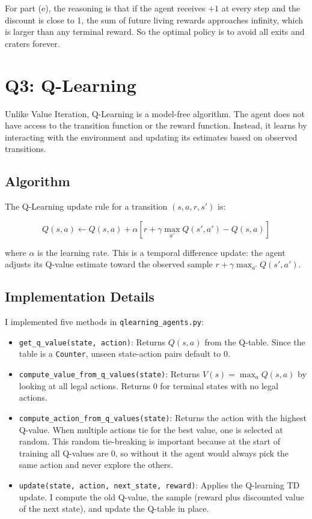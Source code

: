 \documentclass[11pt,a4paper]{article}
\begin{document}
For part (e), the reasoning is that if the agent receives $+1$ at every step and the discount is close to 1, the sum of future living rewards approaches infinity, which is larger than any terminal reward. So the optimal policy is to avoid all exits and craters forever.

\section{Q3: Q-Learning}

Unlike Value Iteration, Q-Learning is a model-free algorithm. The agent does not have access to the transition function or the reward function. Instead, it learns by interacting with the environment and updating its estimates based on observed transitions.

\subsection{Algorithm}

The Q-Learning update rule for a transition $(s, a, r, s')$ is:

\[
Q(s, a) \leftarrow Q(s, a) + \alpha \left[ r + \gamma \max_{a'} Q(s', a') - Q(s, a) \right]
\]

where $\alpha$ is the learning rate. This is a temporal difference update: the agent adjusts its Q-value estimate toward the observed sample $r + \gamma \max_{a'} Q(s', a')$.

\subsection{Implementation Details}

I implemented five methods in \texttt{qlearning\_agents.py}:

\begin{itemize}[leftmargin=2em]
    \item \texttt{get\_q\_value(state, action)}: Returns $Q(s,a)$ from the Q-table. Since the table is a \texttt{Counter}, unseen state-action pairs default to 0.

    \item \texttt{compute\_value\_from\_q\_values(state)}: Returns $V(s) = \max_a Q(s,a)$ by looking at all legal actions. Returns 0 for terminal states with no legal actions.

    \item \texttt{compute\_action\_from\_q\_values(state)}: Returns the action with the highest Q-value. When multiple actions tie for the best value, one is selected at random. This random tie-breaking is important because at the start of training all Q-values are 0, so without it the agent would always pick the same action and never explore the others.

    \item \texttt{update(state, action, next\_state, reward)}: Applies the Q-learning TD update. I compute the old Q-value, the sample (reward plus discounted value of the next state), and update the Q-table in place.
\end{itemize}
\end{document}
